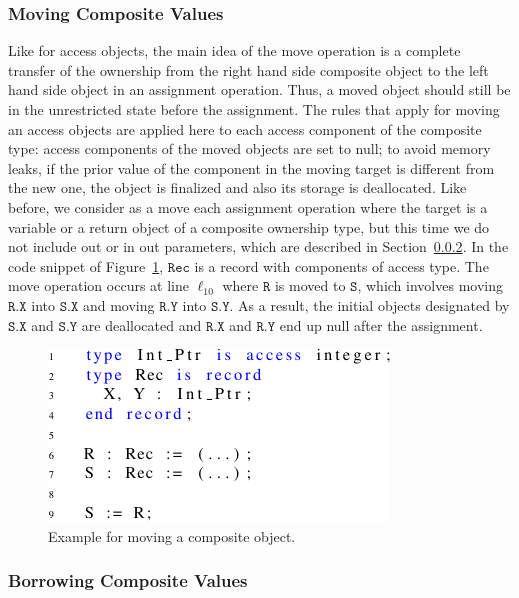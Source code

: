 \documentclass{llncs}
\newcommand\var[1]{\ensuremath{\mathtt{#1}}}
\newcommand{\keyword}[1]{\textsf{#1}}
\begin{document}
\subsubsection{Moving Composite Values}
\label{subsubsec:movingComposite}

Like for access objects, the main idea of the move operation is a complete transfer of the ownership from the right hand side composite object to the left hand
side object in an assignment operation. Thus, a moved object should still be in the unrestricted state before the assignment. The rules that apply for moving an
access objects are applied here to each access component of the composite type: access components of the moved objects are set to null; to avoid memory leaks, if the
prior value of the component in the moving target is different from the new one, the object is finalized and also its storage is deallocated.  
Like before, we consider as a move each assignment operation where the target is a variable or a return object of a composite ownership type, but this time we do not
include \keyword{out} or \keyword{in out} parameters, which are described in Section~\ref{subsubsec:borrowComposite}.
In the code snippet of Figure~\ref{fig:movingComposite}, \var{Rec} is a record with components of access type. The move operation occurs at line $\ell_{10}$ where \var{R} is moved
to \var{S}, which involves moving \var{R.X} into \var{S.X} and moving \var{R.Y} into \var{S.Y}. As a result, the initial objects designated by
\var{S.X} and \var{S.Y} are deallocated and \var{R.X} and \var{R.Y} end up null after the assignment. 


\begin{figure}[htb!]
\centering
   \includegraphics[]{movingComposite}
   \caption{Example for moving a composite object.}
   \label{fig:movingComposite}
\end{figure}
 
\subsubsection{Borrowing Composite Values}
\label{subsubsec:borrowComposite}
\end{document}
